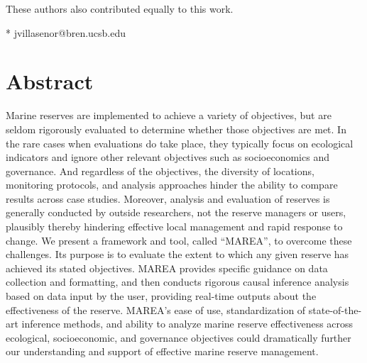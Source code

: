 \documentclass[10pt,letterpaper]{article}
\begin{document}
\begin{flushleft}
\ddag These authors also contributed equally to this work.




* jvillasenor@bren.ucsb.edu

\end{flushleft}
\section*{Abstract}
Marine reserves are implemented to achieve a variety of objectives, but are seldom rigorously evaluated to determine whether those objectives are met. In the rare cases when evaluations do take place, they typically focus on ecological indicators and ignore other relevant objectives such as socioeconomics and governance. And regardless of the objectives, the diversity of locations, monitoring protocols, and analysis approaches hinder the ability to compare results across case studies. Moreover, analysis and evaluation of reserves is generally conducted by outside researchers, not the reserve managers or users, plausibly thereby hindering effective local management and rapid response to change. We present a framework and tool, called ``MAREA'', to overcome these challenges. Its purpose is to evaluate the extent to which any given reserve has achieved its stated objectives. MAREA provides specific guidance on data collection and formatting, and then conducts rigorous causal inference analysis based on data input by the user, providing real-time outputs about the effectiveness of the reserve. MAREA's ease of use, standardization of state-of-the-art inference methods, and ability to analyze marine reserve effectiveness across ecological, socioeconomic, and governance objectives could dramatically further our understanding and support of effective marine reserve management.
\end{document}

